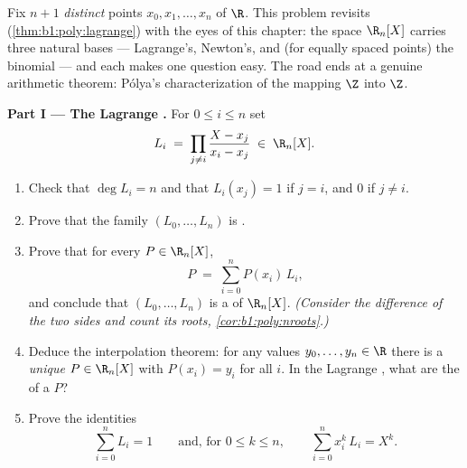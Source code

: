 \begin{problem}\label{pb:b1:vspaces:1}
Fix $n + 1$ \emph{distinct} points $x_0, x_1, \dots, x_n$ of $\R$.
This problem revisits 
(\cref{thm:b1:poly:lagrange}) with the eyes of this chapter: the
space $\R_n[X]$ carries three natural bases --- Lagrange's,
Newton's, and (for equally spaced points) the binomial  ---
and each  makes one question easy. The road ends at a genuine
arithmetic theorem: P\'olya's characterization of the 
mapping $\Z$ into $\Z$.

\medskip
\noindent\textbf{Part I --- The Lagrange .} For $0 \leq i
\leq n$ set
\[
L_i \;=\; \prod_{j \neq i} \frac{X - x_j}{x_i - x_j} \;\in\;
\R_n[X].
\]
\begin{enumerate}
  \item Check that $\deg L_i = n$ and that $L_i(x_j) = 1$ if $j =
        i$, and $0$ if $j \neq i$.
  \item Prove that the family $(L_0, \dots, L_n)$ is .
  \item Prove that for every $P \in \R_n[X]$,
        \[
        P \;=\; \sum_{i=0}^{n} P(x_i)\, L_i ,
        \]
        and conclude that $(L_0, \dots, L_n)$ is a  of
        $\R_n[X]$. \emph{(Consider the difference of the two sides
        and count its roots, \cref{cor:b1:poly:nroots}.)}
  \item Deduce the interpolation theorem: for any values $y_0,
        \dots, y_n \in \R$ there is a \emph{unique} $P \in
        \R_n[X]$ with $P(x_i) = y_i$ for all $i$. In the Lagrange
        , what are the  of a  $P$?
  \item Prove the identities
        \[
        \sum_{i=0}^{n} L_i = 1
        \qquad\text{and, for } 0 \leq k \leq n,\qquad
        \sum_{i=0}^{n} x_i^{k}\, L_i = X^{k} .
        \]
\end{enumerate}


\end{problem}
